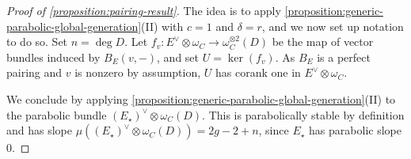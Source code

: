 \begin{proof}[Proof of \autoref{proposition:pairing-result}]
The idea is to apply
\autoref{proposition:generic-parabolic-global-generation}(II) with $c =1$ and
$\delta = r$, and we now set up notation to do so.
Set $n=\deg D$. Let $f_v: E^\vee\otimes \omega_C\to \omega_C^{\otimes 2}(D)$ be the map of vector bundles induced by $B_E(v, -)$, and set $U=\ker(f_v)$.
As $B_E$ is a perfect pairing and $v$ is nonzero by assumption, $U$ has corank one in $E^\vee\otimes \omega_C$.

We conclude by applying \autoref{proposition:generic-parabolic-global-generation}(II)
to the parabolic bundle $(E_\star)^\vee \otimes
\omega_C(D)$.
This is parabolically stable by definition and
has slope $\mu((E_\star)^\vee \otimes
\omega_C(D)) = 2g - 2+n$,
since $E_\star$ has parabolic slope $0$.


\end{proof}
